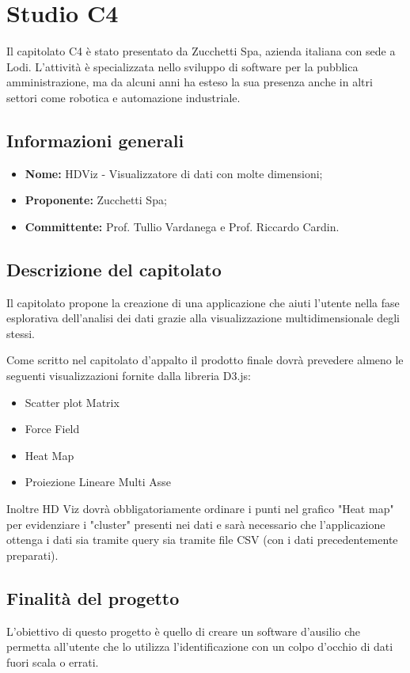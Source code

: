 \section{Studio C4} \label{_c4}
Il capitolato C4 è stato presentato da Zucchetti Spa, azienda italiana con sede a Lodi. L'attività è specializzata nello sviluppo di software per la pubblica amministrazione, ma da alcuni anni ha esteso la sua presenza anche in altri settori come robotica e automazione industriale.

\subsection{Informazioni generali}
\begin{itemize}
    \item \textbf{Nome:} HDViz - Visualizzatore di dati con molte dimensioni;
    \item \textbf{Proponente:} Zucchetti Spa;
    \item \textbf{Committente:} Prof. Tullio Vardanega e Prof. Riccardo Cardin.
\end{itemize}

\subsection{Descrizione del capitolato}
Il capitolato propone la creazione di una applicazione che aiuti l'utente nella fase esplorativa dell'analisi dei dati grazie alla visualizzazione multidimensionale degli stessi.

Come scritto nel capitolato d'appalto il prodotto finale dovrà prevedere almeno le seguenti visualizzazioni fornite dalla libreria D3.js:
\begin{itemize}
    \item Scatter plot Matrix
    \item Force Field
    \item Heat Map
    \item Proiezione Lineare Multi Asse
\end{itemize}

Inoltre HD Viz dovrà obbligatoriamente ordinare i punti nel grafico "Heat map" per evidenziare i "cluster" presenti nei dati e sarà necessario che l'applicazione ottenga i dati sia tramite query sia tramite file CSV (con i dati precedentemente preparati).

\subsection{Finalità del progetto}
L'obiettivo di questo progetto è quello di creare un software d'ausilio che permetta all'utente che lo utilizza l'identificazione con un colpo d'occhio di dati fuori scala o errati.

